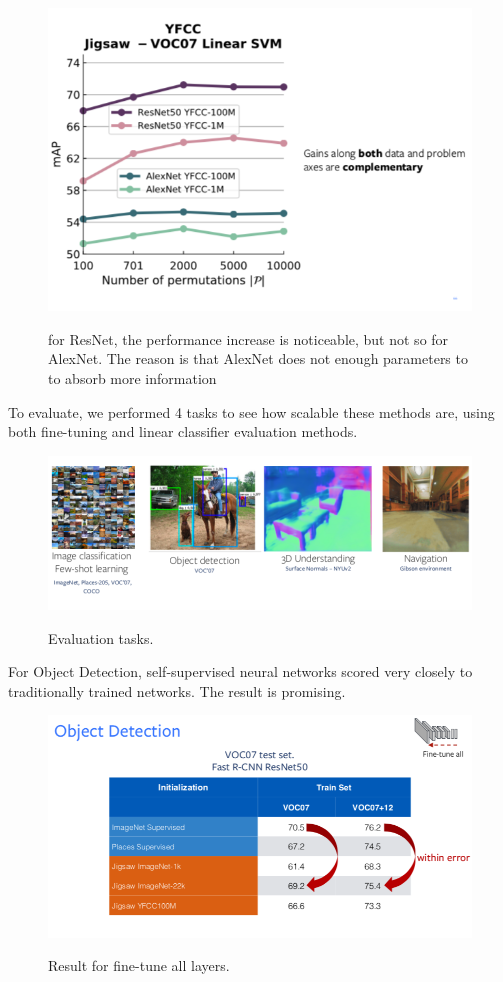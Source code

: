 \begin{figure}[H]
\centering
\includegraphics[width=0.8\linewidth]{lectures/13-b/graphics/combined.png}
\label{fig:combined}
\caption{for ResNet, the performance increase is noticeable, but not so for AlexNet. The reason is that AlexNet does not enough parameters to to absorb more information}
\end{figure}

To evaluate, we performed 4 tasks to see how scalable these methods are, using both fine-tuning and linear classifier evaluation methods.

\begin{figure}[H]
\centering
\includegraphics[width=0.8\linewidth]{lectures/13-b/graphics/evaluation.png}
\label{fig:evaluation}
\caption{Evaluation tasks.}
\end{figure}

For Object Detection, self-supervised neural networks scored very closely to traditionally trained networks. The result is promising.


\begin{figure}[H]
\centering
\includegraphics[width=0.8\linewidth]{lectures/13-b/graphics/od.png}
\label{fig:od}
\caption{Result for fine-tune all layers.}
\end{figure}

